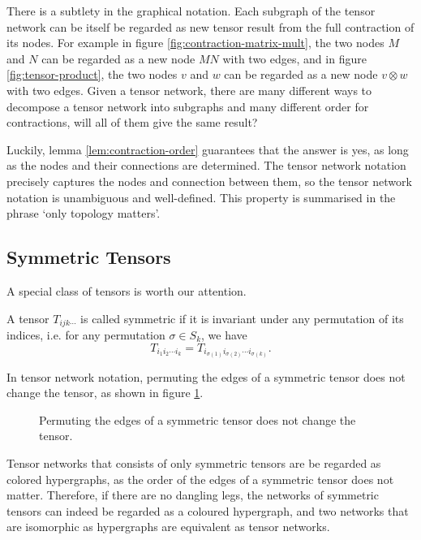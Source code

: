There is a subtlety in the graphical notation.
Each subgraph of the tensor network can be itself be regarded as new tensor result from the full contraction of its nodes.
For example in figure \ref{fig:contraction-matrix-mult}, the two nodes $M$ and $N$ can be regarded as a new node $MN$ with two edges, and in figure \ref{fig:tensor-product}, the two nodes $v$ and $w$ can be regarded as a new node $v \otimes w$ with two edges.
Given a tensor network, there are many different ways to decompose a tensor network into subgraphs and many different order for contractions, will all of them give the same result?

Luckily, lemma \ref{lem:contraction-order} guarantees that the answer is yes, as long as the nodes and their connections are determined.
The tensor network notation precisely captures the nodes and connection between them, so the tensor network notation is unambiguous and well-defined.
This property is summarised in the phrase `only topology matters'.

\subsection{Symmetric Tensors}

A special class of tensors is worth our attention. 

\begin{definition}
	A tensor $T_{ijk\cdots}$ is called symmetric if it is invariant under any permutation of its indices, i.e. for any permutation $\sigma \in S_k$, we have
	$$
		T_{i_1 i_2 \cdots i_k} = T_{i_{\sigma(1)} i_{\sigma(2)} \cdots i_{\sigma(k)}}.
	$$
\end{definition}\label{def:symmetric-tensor}

In tensor network notation, permuting the edges of a symmetric tensor does not change the tensor, as shown in figure \ref{fig:symmetric-tensor}.

\begin{figure}[ht]
	\centering
	
	\caption{Permuting the edges of a symmetric tensor does not change the tensor.}
	\label{fig:symmetric-tensor}
\end{figure}

Tensor networks that consists of only symmetric tensors are be regarded as colored hypergraphs, as the order of the edges of a symmetric tensor does not matter.
Therefore, if there are no dangling legs, the networks of symmetric tensors can indeed be regarded as a coloured hypergraph, and two networks that are isomorphic as hypergraphs are equivalent as tensor networks.

